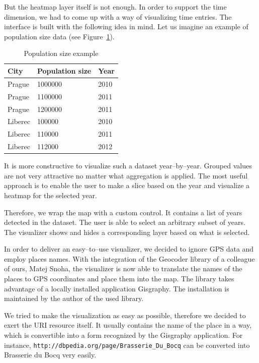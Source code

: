 But the heatmap layer itself is not enough. In order to support the time 
dimension, we had to come up with a way of visualizing time entries. The 
interface is built with the following idea in mind. Let us imagine an example of 
population size data (see Figure~\ref{fig:impl-pop-ex}).

\begin{table}
  \begin{center}
\begin{tabular}{l|l|l}
  City & Population size & Year \\ \hline
  Prague   &    1000000   &   2010 \\
  Prague   &    1100000   &   2011 \\
  Prague   &    1200000   &   2011 \\
  Liberec   &    100000    &  2010 \\
  Liberec   &    110000    &  2011 \\
  Liberec    &   112000    &  2012
\end{tabular}
\caption{Population size example}
\label{fig:impl-pop-ex}
  \end{center}
\end{table}

It is more constructive to visualize such a dataset year--by--year. Grouped values are 
not very attractive no matter what aggregation is applied. The most useful 
approach is to enable the user to make a slice based on the year and visualize a 
heatmap for the selected year.

Therefore, we wrap the map with a custom control. It contains a list of years 
detected in the dataset. The user is able to select an arbitrary subset of 
years. The visualizer shows and hides a corresponding layer based on what is 
selected. 

In order to deliver an easy--to--use visualizer, we decided to ignore GPS 
data and employ places names. With the integration of the Geocoder library of a 
colleague of ours, Matej Snoha, the visualizer is now able to translate the names of 
the places to GPS coordinates and place them into the map. The library takes 
advantage of a locally installed application Gisgraphy. The installation is 
maintained by the author of the used library.

We tried to make the visualization as easy as possible, therefore we decided to exert the
URI resource itself. It usually contains the name of the place 
in a way, which is convertible into a form recognized by the Gisgraphy 
application. For instance, \texttt{http://dbpedia.org/page/Brasserie\_Du\_Bocq} 
can be converted into Brasserie du Bocq very easily.

